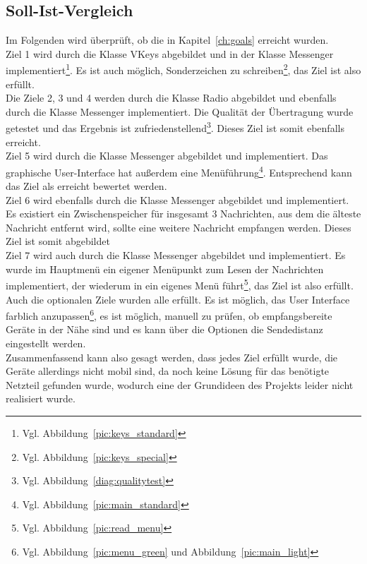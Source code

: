 \documentclass[a4paper, 11pt]{scrartcl}
\begin{document}
\subsection{Soll-Ist-Vergleich}
Im Folgenden wird überprüft, ob die in Kapitel~\ref{ch:goals} erreicht wurden.
\\
Ziel 1 wird durch die Klasse \glqq VKeys\grqq{} abgebildet und in der Klasse \grqq Messenger\glqq{} implementiert\footnote{Vgl. Abbildung~\ref{pic:keys_standard}}. 
Es ist auch möglich, Sonderzeichen zu schreiben\footnote{Vgl. Abbildung~\ref{pic:keys_special}}, das Ziel ist also erfüllt.
\\
Die Ziele 2, 3 und 4 werden durch die Klasse \glqq Radio\grqq{} abgebildet und ebenfalls durch die Klasse \glqq Messenger\grqq{} implementiert. Die Qualität der Übertragung
wurde getestet und das Ergebnis ist zufriedenstellend\footnote{Vgl. Abbildung~\ref{diag:qualitytest}}. Dieses Ziel ist somit ebenfalls erreicht.
\\
Ziel 5 wird durch die Klasse \glqq Messenger\grqq{} abgebildet und implementiert. Das graphische User-Interface hat außerdem eine 
Menüführung\footnote{Vgl. Abbildung~\ref{pic:main_standard}}. Entsprechend kann das Ziel als erreicht bewertet werden.
\\
Ziel 6 wird ebenfalls durch die Klasse \glqq Messenger\grqq{} abgebildet und implementiert. Es existiert ein Zwischenspeicher für insgesamt 3 Nachrichten, aus dem
die älteste Nachricht entfernt wird, sollte eine weitere Nachricht empfangen werden. Dieses Ziel ist somit abgebildet
\\
Ziel 7 wird auch durch die Klasse \glqq Messenger\grqq{} abgebildet und implementiert. Es wurde im Hauptmenü ein eigener Menüpunkt zum Lesen der Nachrichten implementiert,
der wiederum in ein eigenes Menü führt\footnote{Vgl. Abbildung~\ref{pic:read_menu}}, das Ziel ist also erfüllt.
\\
Auch die optionalen Ziele wurden alle erfüllt. Es ist möglich, das User Interface farblich anzupassen\footnote{Vgl. Abbildung~\ref{pic:menu_green} und Abbildung~\ref{pic:main_light}},
es ist möglich, manuell zu prüfen, ob empfangsbereite Geräte in der Nähe sind und es kann über die Optionen die Sendedistanz eingestellt werden.
\\
Zusammenfassend kann also gesagt werden, dass jedes Ziel erfüllt wurde, die Geräte allerdings nicht mobil sind, da noch keine Lösung für das benötigte Netzteil gefunden wurde,
wodurch eine der Grundideen des Projekts leider nicht realisiert wurde.
\end{document}

